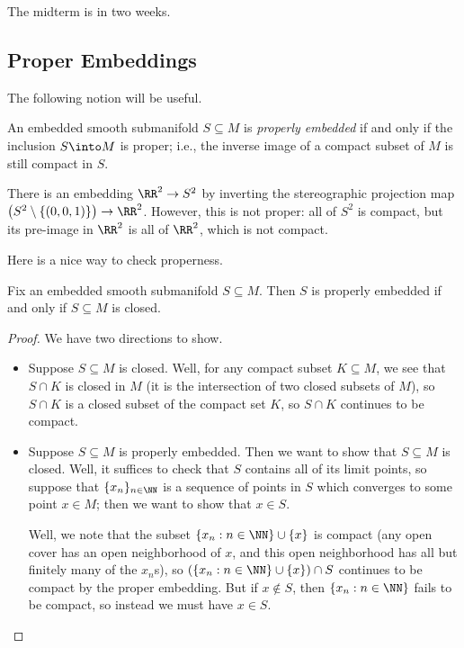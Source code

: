 \documentclass[../notes.tex]{subfiles}
\begin{document}
The midterm is in two weeks.

\subsection{Proper Embeddings}
The following notion will be useful.
\begin{definition}
	An embedded smooth submanifold $S\subseteq M$ is \textit{properly embedded} if and only if the inclusion $S\into M$ is proper; i.e., the inverse image of a compact subset of $M$ is still compact in $S$.
\end{definition}
\begin{nex}
	There is an embedding $\RR^2\to S^2$ by inverting the stereographic projection map $\left(S^2\setminus\{(0,0,1)\}\right)\to\RR^2$. However, this is not proper: all of $S^2$ is compact, but its pre-image in $\RR^2$ is all of $\RR^2$, which is not compact.
\end{nex}
Here is a nice way to check properness.
\begin{proposition} \label{prop:proper-is-closed}
	Fix an embedded smooth submanifold $S\subseteq M$. Then $S$ is properly embedded if and only if $S\subseteq M$ is closed.
\end{proposition}
\begin{proof}
	We have two directions to show.
	\begin{itemize}
		\item Suppose $S\subseteq M$ is closed. Well, for any compact subset $K\subseteq M$, we see that $S\cap K$ is closed in $M$ (it is the intersection of two closed subsets of $M$), so $S\cap K$ is a closed subset of the compact set $K$, so $S\cap K$ continues to be compact.

		\item Suppose $S\subseteq M$ is properly embedded. Then we want to show that $S\subseteq M$ is closed. Well, it suffices to check that $S$ contains all of its limit points, so suppose that $\{x_n\}_{n\in\NN}$ is a sequence of points in $S$ which converges to some point $x\in M$; then we want to show that $x\in S$.

		Well, we note that the subset $\{x_n:n\in\NN\}\cup\{x\}$ is compact (any open cover has an open neighborhood of $x$, and this open neighborhood has all but finitely many of the $x_n$s), so $(\{x_n:n\in\NN\}\cup\{x\})\cap S$ continues to be compact by the proper embedding. But if $x\notin S$, then $\{x_n:n\in\NN\}$ fails to be compact, so instead we must have $x\in S$.
		\qedhere
	\end{itemize}
\end{proof}
\end{document}
